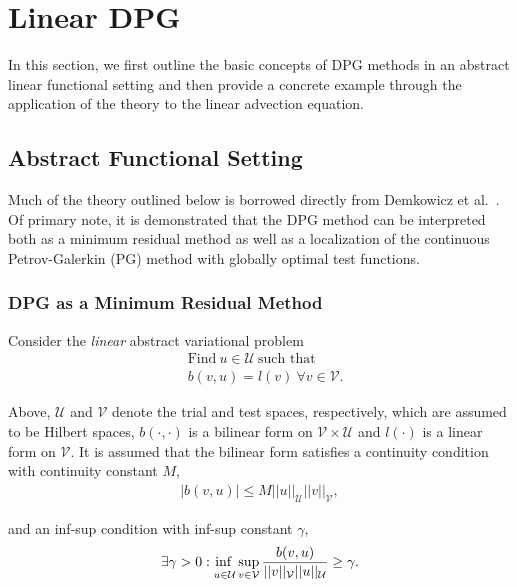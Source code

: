 \section{Linear DPG} \label{sec:dpg_linear}

In this section, we first outline the basic concepts of DPG methods in an abstract linear functional setting and then provide a concrete example through the application of the theory to the linear advection equation.

\subsection{Abstract Functional Setting}

Much of the theory outlined below is borrowed directly from Demkowicz et al.~\cite{Demkowicz2014_overview}. Of primary note, it is demonstrated that the DPG method can be interpreted both as a minimum residual method as well as a localization of the continuous Petrov-Galerkin (PG) method with globally optimal test functions.

\subsubsection{DPG as a Minimum Residual Method}

Consider the \textit{linear} abstract variational problem
\begin{align}
& \text{Find}\ u \in \mathcal{U}\ \text{such that}\\
& b(v,u) = l(v)\ \forall v \in \mathcal{V}.
\end{align}

Above, $\mathcal{U}$ and $\mathcal{V}$ denote the trial and test spaces, respectively, which are assumed to be Hilbert spaces, $b(\cdot,\cdot)$ is a bilinear form on $\mathcal{V} \times \mathcal{U}$ and $l(\cdot)$ is a linear form on $\mathcal{V}$. It is assumed that the bilinear form satisfies a continuity condition with continuity constant $M$,
\begin{align}
| b(v,u) | \le M ||u||_{\mathcal{U}} ||v||_{\mathcal{V}},
\end{align}

and an inf-sup condition with inf-sup constant $\gamma$,
\begin{align}
\exists \gamma > 0 : \adjustlimits\inf_{u\in\mathcal{U}} \sup_{v\in\mathcal{V}} \frac{b(v,u)}{||v||_{\mathcal{V}}||u||_{\mathcal{U}}} \ge \gamma.
\end{align}

